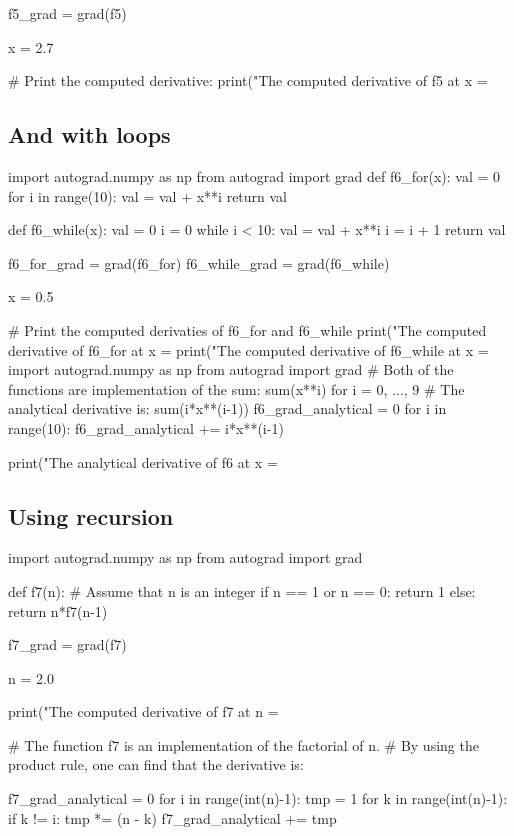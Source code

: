 \documentclass[%
oneside,                 %
final,                   %
10pt]{article}
\begin{document}
f5_grad = grad(f5)

x = 2.7

# Print the computed derivative:
print("The computed derivative of f5 at x = %
\epycod


\subsection{And  with loops}

\bpycod
import autograd.numpy as np
from autograd import grad
def f6_for(x):
    val = 0
    for i in range(10):
        val = val + x**i
    return val

def f6_while(x):
    val = 0
    i = 0
    while i < 10:
        val = val + x**i
        i = i + 1
    return val

f6_for_grad = grad(f6_for)
f6_while_grad = grad(f6_while)

x = 0.5

# Print the computed derivaties of f6_for and f6_while
print("The computed derivative of f6_for at x = %
print("The computed derivative of f6_while at x = %
\epycod
\bpycod
import autograd.numpy as np
from autograd import grad
# Both of the functions are implementation of the sum: sum(x**i) for i = 0, ..., 9
# The analytical derivative is: sum(i*x**(i-1)) 
f6_grad_analytical = 0
for i in range(10):
    f6_grad_analytical += i*x**(i-1)

print("The analytical derivative of f6 at x = %
\epycod

\subsection{Using recursion}
\bpycod
import autograd.numpy as np
from autograd import grad

def f7(n): # Assume that n is an integer
    if n == 1 or n == 0:
        return 1
    else:
        return n*f7(n-1)

f7_grad = grad(f7)

n = 2.0

print("The computed derivative of f7 at n = %

# The function f7 is an implementation of the factorial of n.
# By using the product rule, one can find that the derivative is:

f7_grad_analytical = 0
for i in range(int(n)-1):
    tmp = 1
    for k in range(int(n)-1):
        if k != i:
            tmp *= (n - k)
    f7_grad_analytical += tmp
\end{document}
